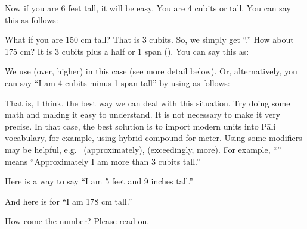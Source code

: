 Now if you are 6 feet tall, it will be easy. You are 4 cubits or  tall. You can say this as follows:


What if you are 150 cm tall? That is 3 cubits. So, we simply get ``.'' How about 175 cm? It is 3 cubits plus a half or 1 span (). You can say this as:


We use  (over, higher) in this case (see more detail below). Or, alternatively, you can say ``I am 4 cubits minus 1 span tall'' by using  as follows:


That is, I think, the best way we can deal with this situation. Try doing some math and making it easy to understand. It is not necessary to make it very precise. In that case, the best solution is to import modern units into P\=ali vocabulary, for example, using hybrid compound  for meter. Using some modifiers may be helpful, e.g.\  (approximately),  (exceedingly, more). For example, ``'' means ``Approximately I am more than 3 cubits tall.''

Here is a way to say ``I am 5 feet and 9 inches tall.''


And here is for ``I am 178 cm tall.''


How come the number? Please read on.

